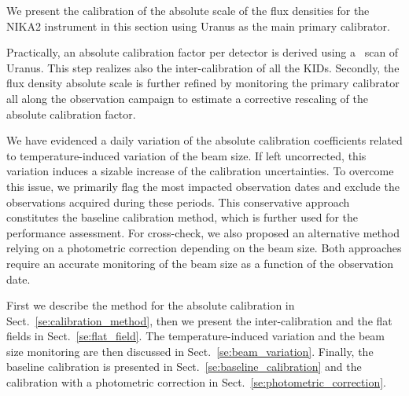 
We present the calibration of the absolute scale of the flux densities
for the NIKA2 instrument in this section using Uranus as the main
primary calibrator.

Practically, %
an absolute calibration factor per detector is derived using a \bm\ scan of
Uranus. This step realizes also the inter-calibration of all the KIDs.%
Secondly, the flux density absolute scale is further refined by
monitoring the primary calibrator all along the observation campaign
to estimate
{\lp a corrective rescaling of the absolute calibration factor}.

We have evidenced a daily variation of the absolute calibration
coefficients related to temperature-induced variation of the beam
size.
If left uncorrected, this variation
induces a sizable increase of the calibration uncertainties. To
overcome this issue, we primarily flag the most impacted observation
dates and exclude the observations acquired during these periods. This
conservative approach constitutes the baseline calibration method,
which is further used for the performance assessment. For cross-check,
we also proposed an alternative method relying on a photometric
correction depending on the beam size. Both approaches require an
accurate monitoring of the beam size as a function of the observation
date.

First we describe the method for the absolute calibration in
Sect.~\ref{se:calibration_method}, then we present the
inter-calibration and the flat fields in
Sect.~\ref{se:flat_field}. The temperature-induced variation and the
beam size monitoring are then discussed in
Sect.~\ref{se:beam_variation}. Finally, the baseline calibration is
presented in Sect.~\ref{se:baseline_calibration} and the calibration
with a photometric correction in
Sect.~\ref{se:photometric_correction}.  




